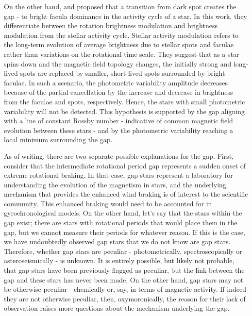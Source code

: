 On the other hand, \citet{reinhold_transition_2018} and \citet{reinhold_stellar_2020} proposed that a transition from dark spot creates the gap - to bright facula dominance in the activity cycle of a star.
In this work, they differentiate between the rotation brightness modulation and brightness modulation from the stellar activity cycle.
Stellar activity modulation refers to the long-term evolution of average brightness due to stellar spots and faculae rather than variations on the rotational time scale.
They suggest that as a star spins down and the magnetic field topology changes, the initially strong and long-lived spots are replaced by smaller, short-lived spots surrounded by bright faculae.
In such a scenario, the photometric variability amplitude decreases because of the partial cancellation by the increase and decrease in brightness from the faculae and spots, respectively.
Hence, the stars with small photometric variability will not be detected.
This hypothesis is supported by the gap aligning with a line of constant Rossby number - indicative of common magnetic field evolution between these stars - and by the photometric variability reaching a local minimum surrounding the gap.

As of writing, there are two separate possible explanations for the gap.
First, consider that the intermediate rotational period gap represents a sudden onset of extreme rotational braking.
In that case, gap stars represent a laboratory for understanding the evolution of the magnetism in stars, and the underlying mechanism that provides the enhanced wind braking is of interest to the scientific community. 
This enhanced braking would need to be accounted for in gyrochronological models.
On the other hand, let's say that the stars within the gap exist; there are stars with rotational periods that would place them in the gap, but we cannot measure their periods for whatever reason.
If this is the case, we have undoubtedly observed gap stars that we do not know are gap stars.
Therefore, whether gap stars are peculiar - photometrically, spectroscopically or asteroseismically - is unknown.
It is entirely possible, but likely not probable, that gap stars have been previously flagged as peculiar, but the link between the gap and these stars has never been made.
On the other hand, gap stars may not be otherwise peculiar - chemically or, say, in terms of magnetic activity.
If indeed they are not otherwise peculiar, then, oxymoronically, the reason for their lack of observation raises more questions about the mechanism underlying the gap.

